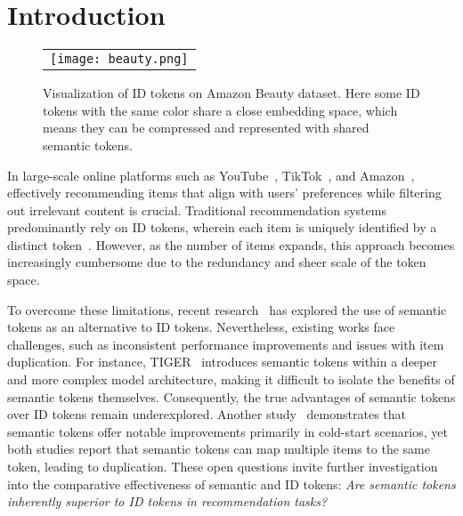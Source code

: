 \section{Introduction}
\begin{figure}[!htb]
		\begin{tabular}{c}
		    	\texttt{[image: beauty.png]}
		\end{tabular}
	\caption{Visualization of ID tokens on Amazon Beauty dataset. Here some ID tokens with the same color share a close embedding space, which means they can be compressed and represented with shared semantic tokens.}	\label{fig:token_dist}
\end{figure} 

In large-scale online platforms such as YouTube~\citep{covington2016deep}, TikTok~\citep{dfar}, and Amazon~\citep{he2016ups}, effectively recommending items that align with users’ preferences while filtering out irrelevant content is crucial. Traditional recommendation systems predominantly rely on ID tokens, wherein each item is uniquely identified by a distinct token~\citep{fm, sasrec}. However, as the number of items expands, this approach becomes increasingly cumbersome due to the redundancy and sheer scale of the token space. 

To overcome these limitations, recent research~\citep{rajput2024recommender, singh2023better} has explored the use of semantic tokens as an alternative to ID tokens. Nevertheless, existing works face challenges, such as inconsistent performance improvements and issues with item duplication. For instance, TIGER~\citep{rajput2024recommender} introduces semantic tokens within a deeper and more complex model architecture, making it difficult to isolate the benefits of semantic tokens themselves. Consequently, the true advantages of semantic tokens over ID tokens remain underexplored. Another study~\citep{singh2023better} demonstrates that semantic tokens offer notable improvements primarily in cold-start scenarios, yet both studies report that semantic tokens can map multiple items to the same token, leading to duplication. These open questions invite further investigation into the comparative effectiveness of semantic and ID tokens: \textit{Are semantic tokens inherently superior to ID tokens in recommendation tasks?}

